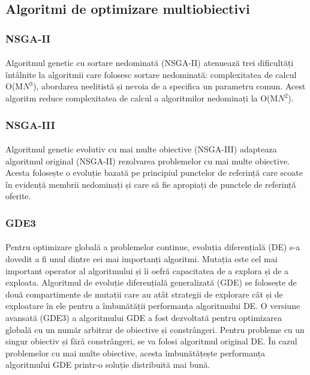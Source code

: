 \documentclass[12pt]{article}
\begin{document}
\subsection{Algoritmi de optimizare multiobiectivi}
\subsubsection{NSGA-II}
\paragraph{}
Algoritmul genetic cu sortare nedominată (NSGA-II) atenuează trei dificultăți întâlnite la algoritmii care folosesc sortare nedominată: complexitatea de calcul O(M$N^3$), abordarea neelitistă și nevoia de a specifica un parametru comun. Acest algoritm reduce complexitatea de calcul a algoritmilor nedominați la O(M$N^2$). \cite{nsgaii}
\subsubsection{NSGA-III}
\paragraph{}
Algoritmul genetic evolutiv cu mai multe obiective (NSGA-III) adapteaza algoritmul original (NSGA-II) rezolvarea problemelor cu mai multe obiective. Acesta folosește o evoluție bazată pe principiul punctelor de referință care scoate în evidență membrii nedominați și care să fie apropiați de punctele de referință oferite. \cite{nsgaiii}
\subsubsection{GDE3}
\paragraph{}
Pentru optimizare globală a problemelor continue, evoluția diferențială (DE) s-a dovedit a fi unul dintre cei mai importanți algoritmi. Mutația este cel mai important operator al algoritmului și îi oefră capacitatea de a explora și de a exploata. Algoritmul de evoluție diferențială generalizată (GDE) se folosește de două compartimente de mutații care au atât strategii de explorare cât și de exploatare în ele pentru a îmbunătății performanța algoritmului DE. \cite{gde} O versiune avansată (GDE3) a algoritmului GDE a fost dezvoltată pentru optimizarea globală cu un număr arbitrar de obiective și constrângeri. Pentru probleme cu un singur obiectiv și fără constrângeri, se va folosi algoritmul original DE. În cazul problemelor cu mai multe obiective, acesta îmbunătățește performanța algoritmului GDE printr-o soluție distribuită mai bună. \cite{gde3}
\end{document}

